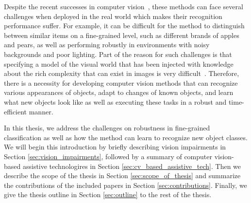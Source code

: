 Despite the recent successes in computer vision~\cite{he2016deep, redmon2017yolo9000, xu2015show}, these methods can face several challenges when deployed in the real world which makes their recognition performance suffer. For example, it can be difficult for the method to distinguish between similar items on a fine-grained level, such as different brands of apples and pears, as well as performing robustly in environments with noisy backgrounds and poor lighting. 
Part of the reason for such challenges is that specifying a model of the visual world that has been injected with knowledge about the rich complexity that can exist in images is very difficult~\cite{szeliski2010computer}. Therefore, there is a necessity for developing computer vision methods that can recognize various appearances of objects, adapt to changes of known objects, and learn what new objects look like as well as executing these tasks in a robust and time-efficient manner. 

In this thesis, we address the challenges on robustness in fine-grained classification as well as how the method can learn to recognize new object classes. We will begin this introduction by briefly describing vision impairments in Section \ref{sec:vision_impairments}, followed by a summary of computer vision-based assistive technologires in Section \ref{sec:cv_based_assistive_tech}. Then we describe the scope of the thesis in Section \ref{sec:scope_of_thesis} and summarize the contributions of the included papers in Section \ref{sec:contributions}. Finally, we give the thesis outline in Section \ref{sec:outline} to the rest of the thesis. 



